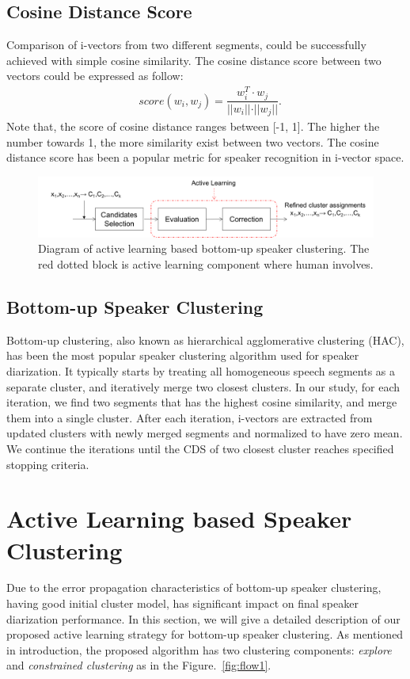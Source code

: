 \documentclass[journal,10pt]{IEEEtran}
\begin{document}
\subsection{Cosine Distance Score}
Comparison of  i-vectors from two different segments, could be successfully achieved with simple cosine similarity. The cosine distance score between two vectors could be expressed as follow:
\begin{equation}
\begin{aligned}
& score (w_i, w_j) = \dfrac{w^T_i \cdot w_j}{\rvert\rvert{w_i}\rvert\rvert \cdot \rvert\rvert{w_j}\rvert\rvert}.
\label{ws2}
\end{aligned}
\end{equation}
Note that, the score of cosine distance ranges between [-1, 1]. The higher the number towards 1, the more similarity exist between two vectors. The cosine distance score has been a popular metric for speaker recognition in i-vector space.

\begin{figure}
	\centering
	\includegraphics[width=\linewidth]{figs/flow6}
	\caption{Diagram of active learning based bottom-up speaker clustering. The red dotted block is active learning component where human involves.}
	\label{fig:flow2}
\end{figure}
 
\subsection{Bottom-up Speaker Clustering}
Bottom-up clustering, also known as hierarchical agglomerative clustering (HAC), has been the most popular speaker clustering algorithm used for speaker diarization. It typically starts by treating all homogeneous speech segments as a separate cluster, and iteratively merge two closest clusters. In our study, for each iteration, we find two segments that has the highest cosine similarity, and merge them into a single cluster. After each iteration, i-vectors are extracted from updated clusters with newly merged segments and normalized to have zero mean. We continue the iterations until the CDS of two closest cluster reaches specified stopping criteria. 

\section{Active Learning based Speaker Clustering}
\label{alsc}
Due to the error propagation characteristics of bottom-up speaker clustering, having good initial cluster model, has significant impact on final speaker diarization performance. In this section, we will give a detailed description of our proposed active learning strategy for bottom-up speaker clustering. As mentioned in introduction, the proposed algorithm has two clustering components: \textit{explore} and \textit{constrained clustering} as in the Figure.~\ref{fig:flow1}.
\end{document}
